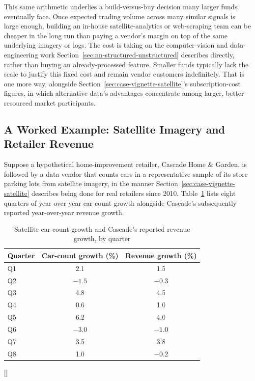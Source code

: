 \documentclass[../ai_in_finance]{subfiles}
\begin{document}
This same arithmetic underlies a build-versus-buy decision many larger funds eventually face. Once expected trading volume across many similar signals is large enough, building an in-house satellite-analytics or web-scraping team can be cheaper in the long run than paying a vendor's margin on top of the same underlying imagery or logs. The cost is taking on the computer-vision and data-engineering work Section~\ref{sec:nn-structured-unstructured} describes directly, rather than buying an already-processed feature. Smaller funds typically lack the scale to justify this fixed cost and remain vendor customers indefinitely. That is one more way, alongside Section~\ref{sec:case-vignette-satellite}'s subscription-cost figures, in which alternative data's advantages concentrate among larger, better-resourced market participants.

\subsection{A Worked Example: Satellite Imagery and Retailer Revenue}
\label{sec:satellite-example}

Suppose a hypothetical home-improvement retailer, Cascade Home \& Garden, is followed by a data vendor that counts cars in a representative sample of its store parking lots from satellite imagery, in the manner Section~\ref{sec:case-vignette-satellite} describes being done for real retailers since 2010. Table~\ref{tab:satellite_regression} lists eight quarters of year-over-year car-count growth alongside Cascade's subsequently reported year-over-year revenue growth.

\begin{table}[htbp]
\centering
\begin{lrbox}{\bookmeasuredbox}
\begin{tabular}{lcc}
\toprule
Quarter & Car-count growth (\%) & Revenue growth (\%) \\
\midrule
Q1 & 2.1 & 1.5 \\
Q2 & $-1.5$ & $-0.3$ \\
Q3 & 4.8 & 4.5 \\
Q4 & 0.6 & 1.0 \\
Q5 & 6.2 & 4.0 \\
Q6 & $-3.0$ & $-1.0$ \\
Q7 & 3.5 & 3.8 \\
Q8 & 1.0 & $-0.2$ \\
\bottomrule
\end{tabular}
\end{lrbox}
\ifdim\wd\bookmeasuredbox<0.65\linewidth
\setlength{\bookcapwidth}{0.65\linewidth}
\else
\setlength{\bookcapwidth}{\wd\bookmeasuredbox}
\fi
{}[\bookcapwidth]{
\usebox{\bookmeasuredbox}
}{
\caption{Satellite car-count growth and Cascade's reported revenue growth, by quarter}
\label{tab:satellite_regression}
}
\end{table}
\end{document}
